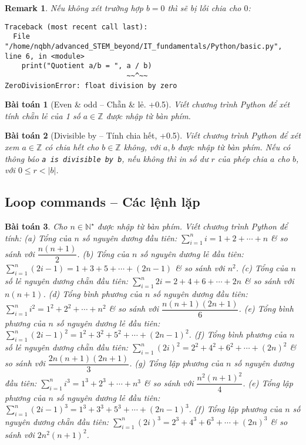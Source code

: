\documentclass{article}
\newtheorem{baitoan}{Bài toán}
\newtheorem{remark}{Remark}
\begin{document}
\begin{remark}
	Nếu không xét trường hợp $b = 0$ thì sẽ bị lỗi chia cho $0$:
	\begin{verbatim}
Traceback (most recent call last):
  File "/home/nqbh/advanced_STEM_beyond/IT_fundamentals/Python/basic.py", line 6, in <module>
    print("Quotient a/b = ", a / b)
                             ~~^~~
ZeroDivisionError: float division by zero
	\end{verbatim}
\end{remark}

\begin{baitoan}[Even \& odd -- Chẵn \& lẻ. +0.5]
	Viết chương trình Python để xét tính chẵn lẻ của 1 số $a\in\mathbb{Z}$ được nhập từ bàn phím.
\end{baitoan}

\begin{baitoan}[Divisible by -- Tính chia hết, +0.5]
	Viết chương trình Python để xét xem $a\in\mathbb{Z}$ có chia hết cho $b\in\mathbb{Z}$ không, với $a,b$ được nhập từ bàn phím. Nếu có thông báo {\tt a is divisible by b}, nếu không thì in số dư $r$ của phép chia $a$ cho $b$, với $0\le r < |b|$.
\end{baitoan}


\subsection{Loop commands -- Các lệnh lặp}

\begin{baitoan}
	Cho $n\in\mathbb{N}^\star$ được nhập từ bàn phím. Viết chương trình Python để tính: (a) Tổng của $n$ số nguyên dương đầu tiên: $\sum_{i=1}^n i = 1 + 2 + \cdots + n$ \& so sánh với $\dfrac{n(n + 1)}{2}$. (b) Tổng của $n$ số nguyên dương lẻ đầu tiên: $\sum_{i=1}^n (2i - 1) = 1 + 3 + 5 + \cdots + (2n - 1)$  \& so sánh với $n^2$. (c) Tổng của $n$ số lẻ nguyên dương chẵn đầu tiên: $\sum_{i=1}^n 2i = 2 + 4 + 6 + \cdots + 2n$ \& so sánh với $n(n + 1)$. (d) Tổng bình phương của $n$ số nguyên dương đầu tiên: $\sum_{i=1}^n i^2 = 1^2 + 2^2 + \cdots + n^2$ \& so sánh với $\dfrac{n(n + 1)(2n + 1)}{6}$. (e) Tổng bình phương của $n$ số nguyên dương lẻ đầu tiên: $\sum_{i=1}^n (2i - 1)^2 = 1^2 + 3^2 + 5^2 + \cdots + (2n - 1)^2$. (f) Tổng bình phương của $n$ số lẻ nguyên dương chẵn đầu tiên: $\sum_{i=1}^n (2i)^2 = 2^2 + 4^2 + 6^2 + \cdots + (2n)^2$ \& so sánh với $\dfrac{2n(n + 1)(2n + 1)}{3}$. (g) Tổng lập phương của $n$ số nguyên dương đầu tiên: $\sum_{i=1}^n i^3 = 1^3 + 2^3 + \cdots + n^3$ \& so sánh với $\dfrac{n^2(n + 1)^2}{4}$. (e) Tổng lập phương của $n$ số nguyên dương lẻ đầu tiên: $\sum_{i=1}^n (2i - 1)^3 = 1^3 + 3^3 + 5^3 + \cdots + (2n - 1)^3$. (f) Tổng lập phương của $n$ số nguyên dương chẵn đầu tiên: $\sum_{i=1}^n (2i)^3 = 2^3 + 4^3 + 6^3 + \cdots + (2n)^3$ \& so sánh với $2n^2(n + 1)^2$.
\end{baitoan}
\end{document}
